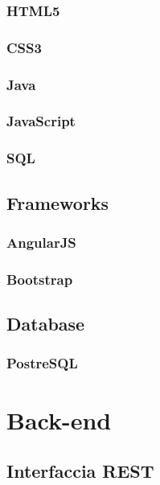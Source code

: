 \documentclass[12pt,a4paper]{article}
\begin{document}
\subsubsection{HTML5}
\TODO{}

\subsubsection{CSS3}
\TODO{\NDC}

\subsubsection{Java}
\TODO{}

\subsubsection{JavaScript}
\TODO{}

\subsubsection{SQL}
\TODO{}

\subsection{Frameworks}
\subsubsection{AngularJS}
\TODO{}
\subsubsection{Bootstrap}
\TODO{\NDC}

\subsection{Database}
\subsubsection{PostreSQL}
\TODO{\TP}

\newpage
\section{Back-end}

\subsection{Interfaccia REST}
\end{document}
